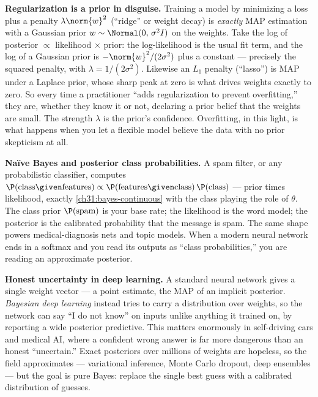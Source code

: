 \begin{applicationbox}
\textbf{Regularization is a prior in disguise.} Training a model by minimizing a loss plus
a penalty $\lambda\norm{w}^2$ (``ridge'' or weight decay) is \emph{exactly} MAP estimation
with a Gaussian prior $w\sim\Normal(0,\,\sigma^2 I)$ on the weights. Take the log of
posterior $\propto$ likelihood $\times$ prior: the log-likelihood is the usual fit term,
and the log of a Gaussian prior is $-\norm{w}^2/(2\sigma^2)$ plus a constant --- precisely
the squared penalty, with $\lambda = 1/(2\sigma^2)$. Likewise an $L_1$ penalty (``lasso'')
is MAP under a Laplace prior, whose sharp peak at zero is what drives weights exactly to
zero. So every time a practitioner ``adds regularization to prevent overfitting,'' they
are, whether they know it or not, declaring a prior belief that the weights are small. The
strength $\lambda$ is the prior's confidence. Overfitting, in this light, is what happens
when you let a flexible model believe the data with no prior skepticism at all.
\end{applicationbox}

\begin{applicationbox}
\textbf{Na\"ive Bayes and posterior class probabilities.} A spam filter, or any
probabilistic classifier, computes $\P(\text{class}\given\text{features}) \propto
\P(\text{features}\given\text{class})\,\P(\text{class})$ --- prior times likelihood,
exactly \eqref{ch31:bayes-continuous} with the class playing the role of $\theta$. The
class prior $\P(\text{spam})$ is your base rate; the likelihood is the word model; the
posterior is the calibrated probability that the message is spam. The same shape powers
medical-diagnosis nets and topic models. When a modern neural network ends in a softmax and
you read its outputs as ``class probabilities,'' you are reading an approximate posterior.
\end{applicationbox}

\begin{applicationbox}
\textbf{Honest uncertainty in deep learning.} A standard neural network gives a single
weight vector --- a point estimate, the MAP of an implicit posterior. \emph{Bayesian deep
learning} instead tries to carry a distribution over weights, so the network can say ``I do
not know'' on inputs unlike anything it trained on, by reporting a wide posterior
predictive. This matters enormously in self-driving cars and medical AI, where a confident
wrong answer is far more dangerous than an honest ``uncertain.'' Exact posteriors over
millions of weights are hopeless, so the field approximates --- variational inference,
Monte Carlo dropout, deep ensembles --- but the goal is pure Bayes: replace the single
best guess with a calibrated distribution of guesses.
\end{applicationbox}

